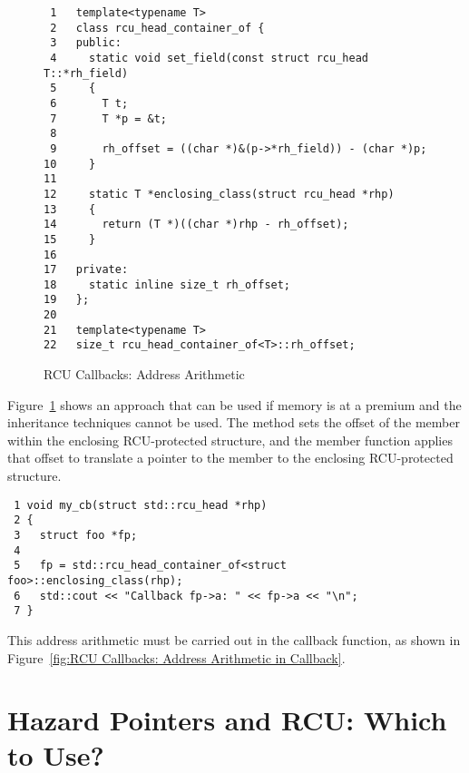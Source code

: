 \documentclass[letterpaper,10pt]{article}
\begin{document}
\begin{figure}[tbp]
{ \scriptsize
\begin{verbatim}
 1   template<typename T>
 2   class rcu_head_container_of {
 3   public:
 4     static void set_field(const struct rcu_head T::*rh_field)
 5     {
 6       T t;
 7       T *p = &t;
 8
 9       rh_offset = ((char *)&(p->*rh_field)) - (char *)p;
10     }
11
12     static T *enclosing_class(struct rcu_head *rhp)
13     {
14       return (T *)((char *)rhp - rh_offset);
15     }
16
17   private:
18     static inline size_t rh_offset;
19   };
20
21   template<typename T>
22   size_t rcu_head_container_of<T>::rh_offset;
\end{verbatim}
}
\caption{RCU Callbacks: Address Arithmetic}
\label{fig:RCU Callbacks: Address Arithmetic}
\end{figure}

Figure~\ref{fig:RCU Callbacks: Address Arithmetic}
shows an approach that can be used if memory is at a premium and
the inheritance techniques cannot be used.
The  method sets the offset of the
 member within the enclosing RCU-protected
structure, and the  member function
applies that offset to translate a pointer to the
 member to the enclosing RCU-protected structure.

\begin{figure*}[tbp]
{ \scriptsize
\begin{verbatim}
 1 void my_cb(struct std::rcu_head *rhp)
 2 {
 3   struct foo *fp;
 4
 5   fp = std::rcu_head_container_of<struct foo>::enclosing_class(rhp);
 6   std::cout << "Callback fp->a: " << fp->a << "\n";
 7 }
\end{verbatim}
}
\caption{RCU Callbacks: Address Arithmetic in Callback}
\label{fig:RCU Callbacks: Address Arithmetic in Callback}
\end{figure*}

This address arithmetic must be carried out in the callback function,
as shown in
Figure~\ref{fig:RCU Callbacks: Address Arithmetic in Callback}.

\section{Hazard Pointers and RCU: Which to Use?}
\label{sec:Hazard Pointers and RCU: Which to Use?}
\end{document}
